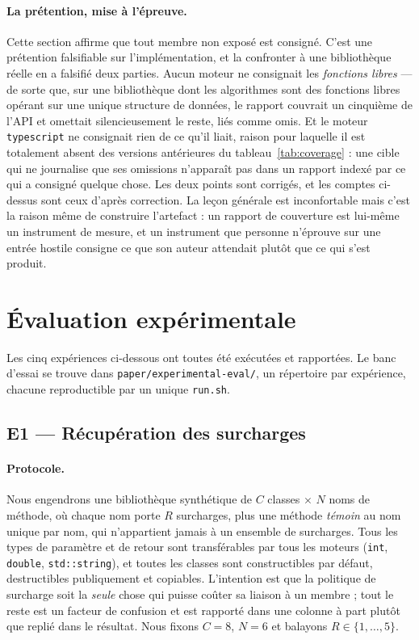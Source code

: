 \documentclass[11pt,a4paper]{article}
\newcommand{\code}[1]{\texttt{\small #1}}
\begin{document}
\paragraph{La prétention, mise à l'épreuve.} Cette section affirme que tout
membre non exposé est consigné. C'est une prétention falsifiable sur
l'implémentation, et la confronter à une bibliothèque réelle en a falsifié deux
parties. Aucun moteur ne consignait les \emph{fonctions libres} --- de sorte que,
sur une bibliothèque dont les algorithmes sont des fonctions libres opérant sur
une unique structure de données, le rapport couvrait un cinquième de l'API et
omettait silencieusement le reste, liés comme omis. Et le moteur
\code{typescript} ne consignait rien de ce qu'il liait, raison pour laquelle il
est totalement absent des versions antérieures du tableau~\ref{tab:coverage} :
une cible qui ne journalise que ses omissions n'apparaît pas dans un rapport
indexé par ce qui a consigné quelque chose. Les deux points sont corrigés, et les
comptes ci-dessus sont ceux d'après correction. La leçon générale est inconfortable
mais c'est la raison même de construire l'artefact : un rapport de couverture est
lui-même un instrument de mesure, et un instrument que personne n'éprouve sur une
entrée hostile consigne ce que son auteur attendait plutôt que ce qui s'est
produit.

\section{Évaluation expérimentale}
\label{sec:eval}

Les cinq expériences ci-dessous ont toutes été exécutées et rapportées. Le banc
d'essai se trouve dans \code{paper/experimental-eval/}, un répertoire par
expérience, chacune reproductible par un unique \code{run.sh}.

\subsection{E1 --- Récupération des surcharges}
\label{sec:e1}

\paragraph{Protocole.} Nous engendrons une bibliothèque synthétique de $C$
classes $\times$ $N$ noms de méthode, où chaque nom porte $R$ surcharges, plus
une méthode \emph{témoin} au nom unique par nom, qui n'appartient jamais à un
ensemble de surcharges. Tous les types de paramètre et de retour sont
transférables par tous les moteurs (\code{int}, \code{double},
\code{std::string}), et toutes les classes sont constructibles par défaut,
destructibles publiquement et copiables. L'intention est que la politique de
surcharge soit la \emph{seule} chose qui puisse coûter sa liaison à un membre ;
tout le reste est un facteur de confusion et est rapporté dans une colonne à part
plutôt que replié dans le résultat. Nous fixons $C=8$, $N=6$ et balayons
$R \in \{1,\dots,5\}$.
\end{document}
